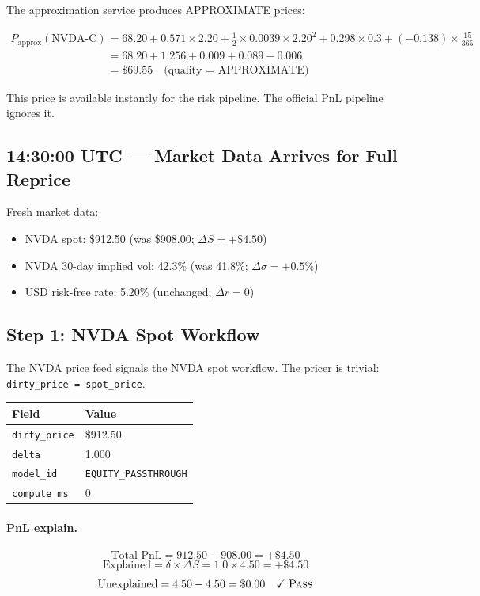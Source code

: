 \documentclass[11pt,a4paper]{article}
\begin{document}
\noindent The approximation service produces APPROXIMATE prices:

\begin{align*}
P_{\mathrm{approx}}(\text{NVDA-C}) &= 68.20 + 0.571 \times 2.20 + \tfrac{1}{2} \times 0.0039 \times 2.20^2 + 0.298 \times 0.3 + (-0.138) \times \tfrac{15}{365} \\
&= 68.20 + 1.256 + 0.009 + 0.089 - 0.006 \\
&= \$69.55 \quad\text{(quality = APPROXIMATE)}
\end{align*}

\noindent This price is available instantly for the risk pipeline.  The official PnL pipeline ignores it.

\subsection{14:30:00 UTC --- Market Data Arrives for Full Reprice}

Fresh market data:
\begin{itemize}[nosep]
\item NVDA spot: \$912.50 (was \$908.00; $\Delta S = +\$4.50$)
\item NVDA 30-day implied vol: 42.3\% (was 41.8\%; $\Delta\sigma = +0.5\%$)
\item USD risk-free rate: 5.20\% (unchanged; $\Delta r = 0$)
\end{itemize}

\subsection{Step 1: NVDA Spot Workflow}

The NVDA price feed signals the NVDA spot workflow.  The pricer is trivial: \texttt{dirty\_price = spot\_price}.

\begin{center}
\small
\begin{tabular}{l l}
\toprule
\textbf{Field} & \textbf{Value} \\
\midrule
\texttt{dirty\_price} & \$912.50 \\
\texttt{delta} & 1.000 \\
\texttt{model\_id} & \texttt{EQUITY\_PASSTHROUGH} \\
\texttt{compute\_ms} & 0 \\
\bottomrule
\end{tabular}
\end{center}

\paragraph{PnL explain.}
\[
\text{Total PnL} = 912.50 - 908.00 = +\$4.50
\]
\[
\text{Explained} = \delta \times \Delta S = 1.0 \times 4.50 = +\$4.50
\]
\[
\text{Unexplained} = 4.50 - 4.50 = \$0.00 \quad\checkmark\;\textsc{Pass}
\]
\end{document}
